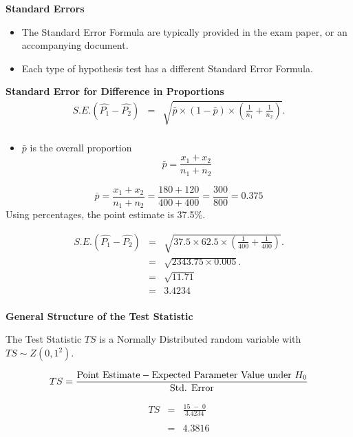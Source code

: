 \documentclass[a4paper,12pt]{article}
\begin{document}
\noindent \textbf{Standard Errors}
\begin{itemize}
    \item The Standard Error Formula are typically provided in the exam paper, or an accompanying document.
    \item Each type of hypothesis test has a different Standard Error Formula.
\end{itemize}
\bigskip
\begin{framed}
\noindent \textbf{Standard Error for Difference in Proportions}\\
\begin{eqnarray*}
	S.E.(\hat{P_1}-\hat{P_2})&=&\sqrt{ \bar{p}\times(1-\bar{p}) \times \left(\frac{1}{n_1}+\frac{1}{n_2}\right)}.\\
\end{eqnarray*}
\begin{itemize}
    \item $\bar{p}$ is the overall proportion
\[    \bar{p} = \frac{x_1 + x_2}{n_1+n_2}\]
\end{itemize}
\end{framed}
\[    \bar{p} = \frac{x_1 + x_2}{n_1+n_2} = \frac{180 + 120}{400 + 400} = \frac{300}{800} = 0.375 \]
\medskip
\noindent Using percentages, the point estimate is 37.5\%.

\begin{eqnarray*}
	S.E.(\hat{P_1}-\hat{P_2})&=&\sqrt{ 37.5 \times 62.5 \times \left(\frac{1}{400}+\frac{1}{400}\right)}.\\
	&=&\sqrt{2343.75 \times 0.005}.\\
	&=&\sqrt{11.71}\\
	&=& 3.4234 \\
\end{eqnarray*}
\newpage 

\noindent \textbf{General Structure of the Test Statistic}

\noindent The Test Statistic $TS$ is a Normally  Distributed random variable with $TS \sim Z(0,1^2)$.
\begin{framed}
\[ TS = {\mbox{Point Estimate} - \mbox{Expected Parameter Value under $H_{0}$} \over \mbox{Std. Error}}\]
\end{framed}


\begin{eqnarray*}
TS &=& \frac{ 15\;-\; 0}{3.4234} \\
& & \\
&=& 4.3816\\
\end{eqnarray*}
\end{document}
